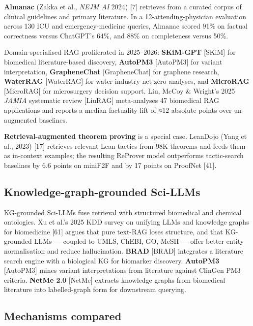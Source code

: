 \textbf{Almanac} (Zakka et al., \emph{NEJM AI} 2024) {[}7{]} retrieves from a curated corpus of clinical guidelines and primary literature. In a 12-attending-physician evaluation across 130 ICU and emergency-medicine queries, Almanac scored 91\% on factual correctness versus ChatGPT's 64\%, and 88\% on completeness versus 50\%.

Domain-specialised RAG proliferated in 2025--2026: \textbf{SKiM-GPT} {[}SKiM{]} for biomedical literature-based discovery, \textbf{AutoPM3} {[}AutoPM3{]} for variant interpretation, \textbf{GrapheneChat} {[}GrapheneChat{]} for graphene research, \textbf{WaterRAG} {[}WaterRAG{]} for water-industry net-zero analyses, and \textbf{MicroRAG} {[}MicroRAG{]} for microsurgery decision support. Liu, McCoy \& Wright's 2025 \emph{JAMIA} systematic review {[}LiuRAG{]} meta-analyses 47 biomedical RAG applications and reports a median factuality lift of ≈12 absolute points over un-augmented baselines.

\textbf{Retrieval-augmented theorem proving} is a special case. LeanDojo (Yang et al., 2023) {[}17{]} retrieves relevant Lean tactics from 98K theorems and feeds them as in-context examples; the resulting ReProver model outperforms tactic-search baselines by 6.6 points on miniF2F and by 17 points on ProofNet {[}41{]}.

\subsection{Knowledge-graph-grounded Sci-LLMs}\label{knowledge-graph-grounded-sci-llms}

KG-grounded Sci-LLMs fuse retrieval with structured biomedical and chemical ontologies. Xu et al.'s 2025 KDD survey on unifying LLMs and knowledge graphs for biomedicine {[}61{]} argues that pure text-RAG loses structure, and that KG-grounded LLMs --- coupled to UMLS, ChEBI, GO, MeSH --- offer better entity normalisation and reduce hallucination. \textbf{BRAD} {[}BRAD{]} integrates a literature search engine with a biological KG for biomarker discovery. \textbf{AutoPM3} {[}AutoPM3{]} mines variant interpretations from literature against ClinGen PM3 criteria. \textbf{NetMe 2.0} {[}NetMe{]} extracts knowledge graphs from biomedical literature into labelled-graph form for downstream querying.

\subsection{Mechanisms compared}\label{mechanisms-compared}

